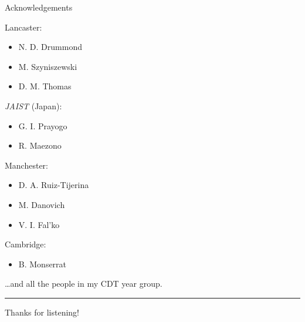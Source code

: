 \documentclass[10pt, pdf, hyperref={draft}, usenames, dvipsnames]{beamer}
\begin{document}
\begin{frame}{Acknowledgements}

\begin{minipage}[t]{0.45\textwidth}

Lancaster:
\begin{itemize}
  \item N. D. Drummond
  \item M. Szyniszewski
  \item D. M. Thomas
\end{itemize}
\vspace{0.5cm}
\textit{JAIST} (Japan):
\begin{itemize}
  \item G. I. Prayogo
  \item R. Maezono
\end{itemize}

\end{minipage}%
\hfill
\begin{minipage}[t]{0.45\textwidth}

Manchester:
\begin{itemize}
  \item D. A. Ruiz-Tijerina
  \item M. Danovich
  \item V. I. Fal'ko
\end{itemize}

\vspace{0.5cm}
Cambridge:
\begin{itemize}
  \item B. Monserrat
\end{itemize}
\vspace{0.5cm}

\ldots and all the people in my CDT year group.

\end{minipage}%
\vfill
\centering\par\noindent\rule{0.7\textwidth}{0.8pt}

\vfill
\begin{center}
  {\Large Thanks for listening!}
\end{center}
\vfill
\end{frame}
\end{document}
